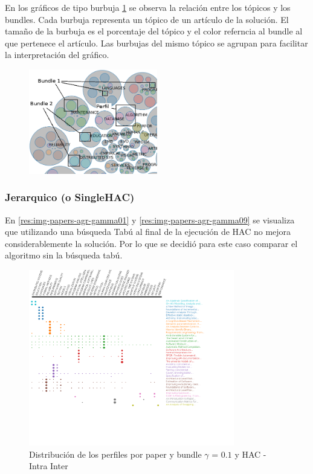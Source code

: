 En los gráficos de tipo burbuja \ref{res:img-explain-bubbles} se observa la relación entre los tópicos y los bundles. Cada burbuja representa un tópico de un artículo de la solución. El tamaño de la burbuja es el porcentaje del tópico y el color referncia al bundle al que pertenece el artículo. Las burbujas del mismo tópico se agrupan para facilitar la interpretación del gráfico.
\begin{figure}[H]
  \centering
    \includegraphics[width=0.5\textwidth]{img/explain-bubbles.png}
  \caption{}
  \label{res:img-explain-bubbles}
\end{figure}
\subsubsection{Jerarquico (o SingleHAC)}
En \ref{res:img-papers-agr-gamma01} y \ref{res:img-papers-agr-gamma09} se visualiza que utilizando una búsqueda Tabú al final de la ejecución  de HAC no mejora considerablemente la solución. Por lo que se decidió para este caso comparar el algoritmo sin la búsqueda tabú.
\begin{figure}[H]
  \centering
    \includegraphics[width=0.8\textwidth]{resultados/papers/HAC/INTRA_INTER/gamma-01.png}
  \caption{Distribución de los perfiles por paper y bundle $\gamma$ = $0.1$ y HAC - Intra Inter}
  \label{res:img-papers-gamma01-hac-intra-inter}
\end{figure}

